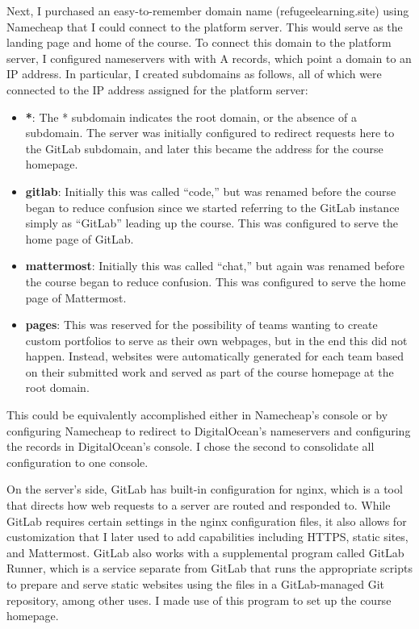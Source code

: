 \documentclass[12pt,twoside]{mitthesis}
\begin{document}
{Next, I purchased an easy-to-remember domain name (refugeelearning.site) using Namecheap that I could connect to the platform server. This would serve as the landing page and home of the course. To connect this domain to the platform server, I configured nameservers with with A records, which point a domain to an IP address. In particular, I created subdomains as follows, all of which were connected to the IP address assigned for the platform server:
\begin{itemize}
\item \textbf{*}: The * subdomain indicates the root domain, or the absence of a subdomain. The server was initially configured to redirect requests here to the GitLab subdomain, and later this became the address for the course homepage.
\item \textbf{gitlab}: Initially this was called ``code,'' but was renamed before the course began to reduce confusion since we started referring to the GitLab instance simply as ``GitLab'' leading up the course. This was configured to serve the home page of GitLab.
\item \textbf{mattermost}: Initially this was called ``chat,'' but again was renamed before the course began to reduce confusion. This was configured to serve the home page of Mattermost.
\item \textbf{pages}: This was reserved for the possibility of teams wanting to create custom portfolios to serve as their own webpages, but in the end this did not happen. Instead, websites were automatically generated for each team based on their submitted work and served as part of the course homepage at the root domain.
\end{itemize}
This could be equivalently accomplished either in Namecheap's console or by configuring Namecheap to redirect to DigitalOcean's nameservers and configuring the records in DigitalOcean's console. I chose the second to consolidate all configuration to one console.

On the server's side, GitLab has built-in configuration for nginx, which is a tool that directs how web requests to a server are routed and responded to. While GitLab requires certain settings in the nginx configuration files, it also allows for customization that I later used to add capabilities including HTTPS, static sites, and Mattermost. GitLab also works with a supplemental program called GitLab Runner, which is a service separate from GitLab that runs the appropriate scripts to prepare and serve static websites using the files in a GitLab-managed Git repository, among other uses. I made use of this program to set up the course homepage.}
\end{document}

